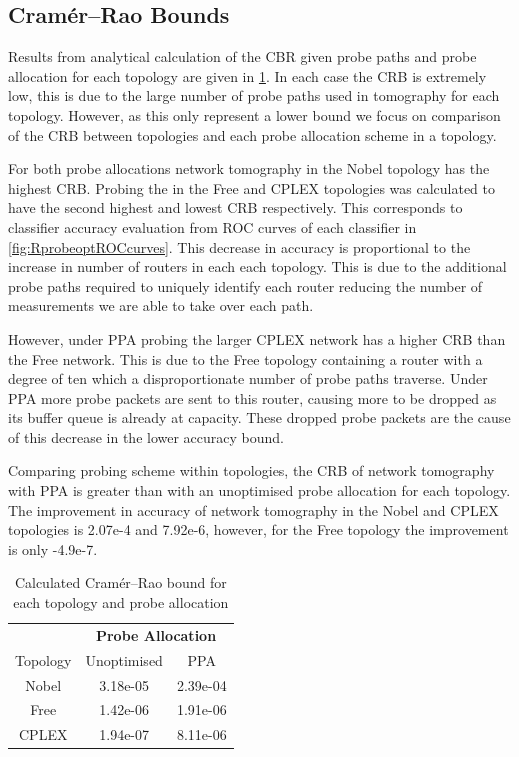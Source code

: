\subsection{Cramér–Rao Bounds}
\label{ssec:Rloweraccuracybounds}
Results from analytical calculation of the CBR given probe paths and probe allocation for each topology are given in \cref{tbl:crbs}. In each case the CRB is extremely low, this is due to the large number of probe paths used in tomography for each topology. However, as this only represent a lower bound we focus on comparison of the CRB between topologies and each probe allocation scheme in a topology.\par
For both probe allocations network tomography in the Nobel topology has the highest CRB. Probing the in the Free and CPLEX topologies was calculated to have the second highest and lowest CRB respectively. This corresponds to classifier accuracy evaluation from ROC curves of each classifier in \cref{fig:RprobeoptROCcurves}. This decrease in accuracy is proportional to the increase in number of routers in each each topology. This is due to the additional probe paths required to uniquely identify each router reducing the number of measurements we are able to take over each path.\par
However, under PPA probing the larger CPLEX network has a higher CRB than the Free network. This is due to the Free topology containing a router with a degree of ten which a disproportionate number of probe paths traverse. Under PPA more probe packets are sent to this router, causing more to be dropped as its buffer queue is already at capacity. These dropped probe packets are the cause of this decrease in the lower accuracy bound.\par
Comparing probing scheme within topologies, the CRB of network tomography with PPA is greater than with an unoptimised probe allocation for each topology. The improvement in accuracy of network tomography in the Nobel and CPLEX topologies is 2.07e-4 and 7.92e-6, however, for the Free topology the improvement is only -4.9e-7.\par
\begin{table}[H]
 \centering
  \begin{tabular}{@{}ccc@{}}
   \toprule
    &\multicolumn{2}{c}{\textbf{Probe Allocation}}\\
    \cmidrule(rl){2-3}
    Topology & Unoptimised & PPA \\
    \midrule
    Nobel & 3.18e-05 & 2.39e-04\\
    Free & 1.42e-06 & 1.91e-06\\
    CPLEX & 1.94e-07 & 8.11e-06\\
   \bottomrule
  \end{tabular}
  \caption{Calculated Cramér–Rao bound for each topology and probe allocation}
  \label{tbl:crbs}
\end{table}
